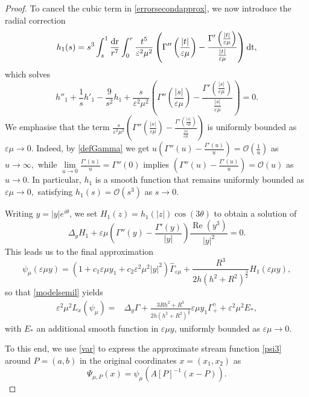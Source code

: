 \documentclass[11pt,reqno,a4paper]{amsart}
\numberwithin{equation}{section}
\newcommand{\ve}{\varepsilon}
\begin{document}
\begin{proof}
To cancel the cubic term in \eqref{errorsecondapprox}, we now introduce the radial correction
\[
h_{1}(s)
= s^3\int_s^1\frac{\rm dr}{r^7}
\int_0^r \frac{t^5}{\ve^2\mu^2}\left(\Gamma''\left(\frac{|t|}{\ve\mu}\right) -\frac{\Gamma'\left(\frac{|t|}{\ve\mu}\right)}{\frac{|t|}{\ve\mu}}\right) \rm d t,
\]
which solves
\[h''_{1}+\frac{1}{s} h'_{1}-\frac{9}{s^2}h_{1} +\frac{s}{\ve^2\mu^2}\left(\Gamma''\left(\frac{|s|}{\ve\mu}\right)-\frac{\Gamma'\left(\frac{|s|}{\ve\mu}\right)}{\frac{|s|}{\ve\mu}}\right)=0.\]
We emphasise that the term $\frac{s}{\ve^2\mu^2}\left(\Gamma''\left(\frac{|s|}{\ve\mu}\right)-\frac{\Gamma'\left(\frac{|s|}{\ve\mu}\right)}{\frac{|s|}{\ve\mu}}\right)$ is uniformly bounded as $\ve\mu\to 0$.
Indeed, by \eqref{defGamma} we get $u\left(\Gamma''(u)-\frac{\Gamma'(u)}{u}\right)=\mathcal{O}\left(\frac{1}{u}\right)$ as $u \to \infty,$ while $\lim\limits_{u\to 0}\frac{\Gamma'(u)}{u}=\Gamma''(0)$ implies $\left(\Gamma''(u)-\frac{\Gamma'(u)}{u}\right)=\mathcal{O}(u)$ as $u \to 0.$ In particular, $h_{1}$ is a smooth function that remains uniformly bounded as $\ve\mu \to 0,$ satisfying $h_{1}(s)=\mathcal{O}(s^3)$ as $s\to 0$. 

Writing $y=|y|e^{i\theta}$, we set $H_{1}(z)=h_{1}(|z|)\cos(3\theta)$ to obtain a solution of
\begin{equation*}
\Delta_{y} H_{1}+\ve\mu\left(\Gamma''(y) -\frac{\Gamma'(y)}{|y|}\right)\frac{\operatorname{Re}(y^3)}{|y|^2} =0.
\end{equation*}
This leads us to the final approximation 
\begin{equation}\label{psi3}
\psi_{\mu}(\ve\mu y)=\left(1+c_1\ve \mu y_1+c_2\ve^2\mu^2|y|^2\right)\widehat\Gamma_{\ve\mu}
+\frac{R^3}{2h(h^2+R^2)^{\frac{3}{2}}}H_{1}(\ve\mu y),
\end{equation}
so that \eqref{modelsemil} yields
\begin{equation*}
\begin{aligned}
\ve^2 \mu^2 L_{x}\left(\psi_{\mu}\right)= &\Delta_y\Gamma
+\frac{3Rh^2+R^3}{2h(h^2+R^2)^\frac{3}{2}}
 \ve\mu y_1 \Gamma_{+}^{\gamma}
 +\ve^2\mu^2 E_{*},
\end{aligned}
\end{equation*}
with $E_{*}$ an additional smooth function in $\ve\mu y$, uniformly bounded as $\ve\mu \to 0$. 

To this end, we use \eqref{var} to express the approximate stream function \eqref{psi3} around $P=(a,b)$ in the original coordinates $x=(x_1,x_2)$ as
\begin{equation*}
\Psi_{\mu,P}(x)=\psi_{\mu}\left(A[P]^{-1}(x-P)\right).
\end{equation*}
\end{proof}
\end{document}
